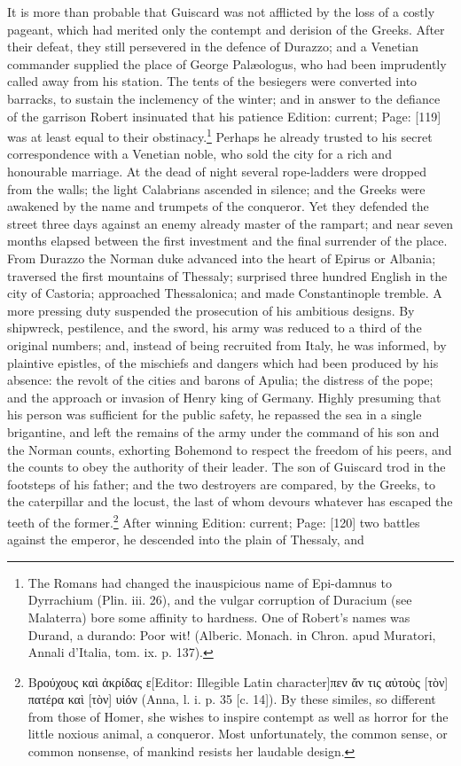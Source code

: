 It is more than probable that Guiscard was not afflicted by the loss of a costly pageant, which had merited only the contempt and derision of the Greeks. After their defeat, they still persevered in the defence of Durazzo; and a Venetian commander supplied the place of George Palæologus, who had been imprudently called away from his station. The tents of the besiegers were converted into barracks, to sustain the inclemency of the winter; and in answer to the defiance of the garrison Robert insinuated that his patience Edition: current; Page: [119] was at least equal to their obstinacy.\footnote{The Romans had changed the inauspicious name of Epi-damnus to Dyrrachium (Plin. iii. 26), and the vulgar corruption of Duracium (see Malaterra) bore some affinity to hardness. One of Robert\texthebrew{}’s names was Durand, a durando: Poor wit! (Alberic. Monach. in Chron. apud Muratori, Annali d\texthebrew{}’Italia, tom. ix. p. 137).} Perhaps he already trusted to his secret correspondence with a Venetian noble, who sold the city for a rich and honourable marriage. At the dead of night several rope-ladders were dropped from the walls; the light Calabrians ascended in silence; and the Greeks were awakened by the name and trumpets of the conqueror. Yet they defended the street three days against an enemy already master of the rampart; and near seven months elapsed between the first investment and the final surrender of the place. From Durazzo the Norman duke advanced into the heart of Epirus or Albania; traversed the first mountains of Thessaly; surprised three hundred English in the city of Castoria; approached Thessalonica; and made Constantinople tremble. A more pressing duty suspended the prosecution of his ambitious designs. By shipwreck, pestilence, and the sword, his army was reduced to a third of the original numbers; and, instead of being recruited from Italy, he was informed, by plaintive epistles, of the mischiefs and dangers which had been produced by his absence: the revolt of the cities and barons of Apulia; the distress of the pope; and the approach or invasion of Henry king of Germany. Highly presuming that his person was sufficient for the public safety, he repassed the sea in a single brigantine, and left the remains of the army under the command of his son and the Norman counts, exhorting Bohemond to respect the freedom of his peers, and the counts to obey the authority of their leader. The son of Guiscard trod in the footsteps of his father; and the two destroyers are compared, by the Greeks, to the caterpillar and the locust, the last of whom devours whatever has escaped the teeth of the former.\footnote{\textgreek{Βρούχους κα\texthebrew{ὶ ἀ}κρίδας ε}[Editor: Illegible Latin character]\textgreek{πεν \texthebrew{ἄ}ν τις α\texthebrew{ὐ}το\texthebrew{ὺ}ς} [\textgreek{τ\texthebrew{ὸ}ν}] \textgreek{πατέρα κα\texthebrew{ὶ}} [\textgreek{τ\texthebrew{ὸ}ν}] \textgreek{υ\texthebrew{ἱ}όν} (Anna, l. i. p. 35 [c. 14]). By these similes, so different from those of Homer, she wishes to inspire contempt as well as horror for the little noxious animal, a conqueror. Most unfortunately, the common sense, or common nonsense, of mankind resists her laudable design.} After winning Edition: current; Page: [120] two battles against the emperor, he descended into the plain of Thessaly, and 